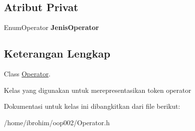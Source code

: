 \subsection*{Atribut Privat}
\begin{DoxyCompactItemize}
\item 
\hypertarget{classOperator_af84004b1a9a08a7595350895a4083fcf}{}Enum\+Operator {\bfseries Jenis\+Operator}\label{classOperator_af84004b1a9a08a7595350895a4083fcf}

\end{DoxyCompactItemize}


\subsection{Keterangan Lengkap}
Class \hyperlink{classOperator}{Operator}. 

Kelas yang digunakan untuk merepresentasikan token operator 

Dokumentasi untuk kelas ini dibangkitkan dari file berikut\+:\begin{DoxyCompactItemize}
\item 
/home/ibrohim/oop002/Operator.\+h\end{DoxyCompactItemize}

